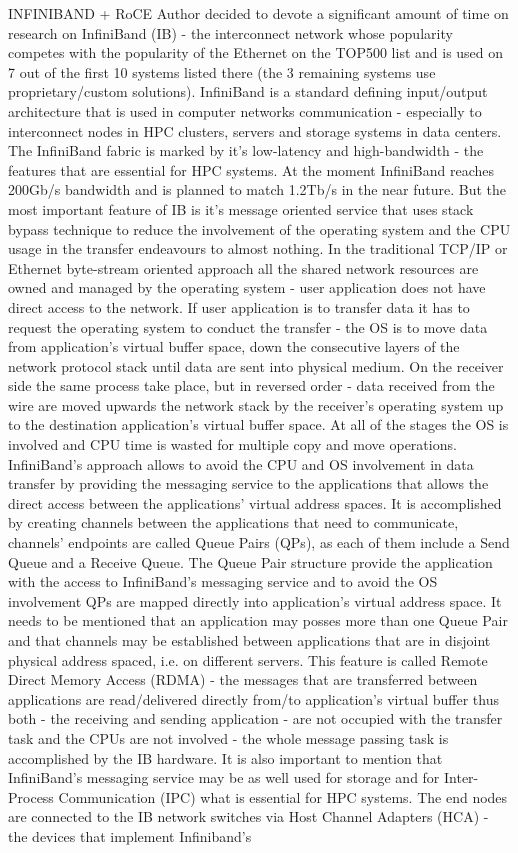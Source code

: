 \documentclass[magisterska,en]{pracamgr}
\begin{document}
INFINIBAND + RoCE
Author decided to devote a significant amount of time on research on InfiniBand (IB) - the interconnect network whose popularity competes with the popularity of the Ethernet on the TOP500 list and is used on 7 out of the first 10 systems listed there (the 3 remaining systems use proprietary/custom solutions). \cite{top500_list} InfiniBand is a standard defining input/output architecture that is used in computer networks communication - especially to interconnect nodes in HPC clusters, servers and storage systems in data centers. The InfiniBand fabric is marked by it's low-latency and high-bandwidth - the features that are essential for HPC systems. At the moment InfiniBand reaches 200Gb/s bandwidth and is planned to match 1.2Tb/s in the near future.\cite{ibta_about_page} But the most important feature of IB is it's message oriented service that uses stack bypass technique to reduce the involvement of the operating system and the CPU usage in the transfer endeavours to almost nothing. In the traditional TCP/IP or Ethernet byte-stream oriented approach all the shared network resources are owned and managed by the operating system - user application does not have direct access to the network. If user application is to transfer data it has to request the operating system to conduct the transfer - the OS is to move data from application's virtual buffer space, down the consecutive layers of the network protocol stack until data are sent into physical medium. On the receiver side the same process take place, but in reversed order - data received from the wire are moved upwards the network stack by the receiver's operating system up to the destination application's virtual buffer space. At all of the stages the OS is involved and CPU time is wasted for multiple copy and move operations. InfiniBand's approach allows to avoid the CPU and OS involvement in data transfer by providing the messaging service to the applications that allows the direct access between the applications' virtual address spaces. It is accomplished by creating channels between the applications that need to communicate, channels' endpoints are called Queue Pairs (QPs), as each of them include a Send Queue and a Receive Queue. The Queue Pair structure provide the application with the access to InfiniBand's messaging service and to avoid the OS involvement QPs are mapped directly into application's virtual address space. It needs to be mentioned that an application may posses more than one Queue Pair and that channels may be established between applications that are in disjoint physical address spaced, i.e. on different servers. This feature is called Remote Direct Memory Access (RDMA) - the messages that are transferred between applications are read/delivered directly from/to application's virtual buffer thus both - the receiving and sending application - are not occupied with the transfer task and the CPUs are not involved - the whole message passing task is accomplished by the IB hardware. It is also important to mention that InfiniBand's messaging service may be as well used for storage and for Inter-Process Communication (IPC) what is essential for HPC systems. The end nodes are connected to the IB network switches via Host Channel Adapters (HCA) - the devices that implement Infiniband's 
\end{document}

